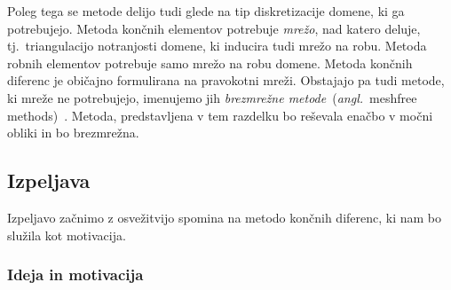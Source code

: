 \documentclass[12pt,a4paper,twoside]{article}
\theoremstyle{definition} %
\theoremstyle{plain} %
\numberwithin{equation}{section}
\newcommand{\ang}[1]{(\textit{angl.}\ #1)}
\begin{document}
Poleg tega se metode delijo tudi glede na tip diskretizacije domene, ki ga potrebujejo. Metoda
končnih elementov potrebuje \emph{mrežo}, nad katero deluje, tj.\ triangulacijo notranjosti domene,
ki inducira tudi mrežo na robu.  Metoda robnih elementov potrebuje samo mrežo na robu domene. Metoda
končnih diferenc je običajno formulirana na pravokotni mreži. Obstajajo pa tudi metode, ki mreže ne
potrebujejo, imenujemo jih \emph{brezmrežne metode}~\ang{meshfree methods}~\cite{meshless_review}.
Metoda, predstavljena v tem razdelku bo reševala enačbo v močni obliki in bo brezmrežna.

\subsection{Izpeljava}

Izpeljavo začnimo z osvežitvijo spomina na metodo končnih diferenc, ki nam bo
služila kot motivacija.

\subsubsection{Ideja in motivacija}
\end{document}
